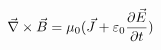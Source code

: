 \documentclass[preview]{standalone}
\begin{document}
\begin{align*}
\special{dvisvgm:raw <g id='unique000'>}\vec{\nabla} \times \vec{B} = \mu_0 (\vec{J} +\varepsilon_0 \frac{\partial \vec{E}}{\partial t})\special{dvisvgm:raw </g>}
\end{align*}
\end{document}
